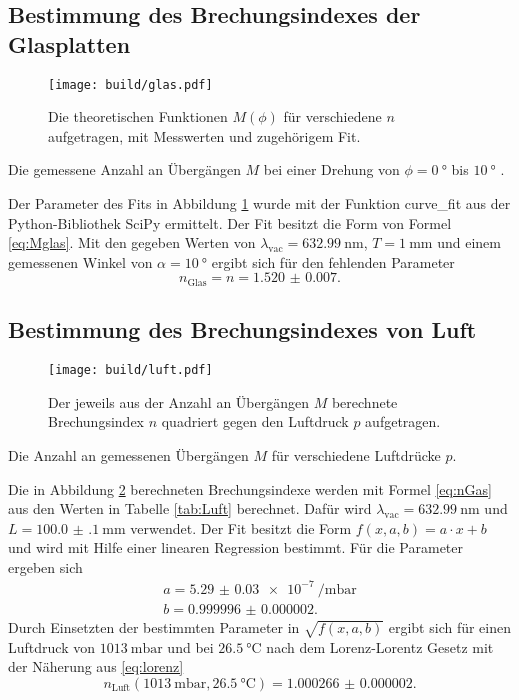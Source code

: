 \subsection{Bestimmung des Brechungsindexes der Glasplatten}
\label{ssec:glas}
\begin{figure}
	\centering
	\texttt{[image: build/glas.pdf]}
	\caption{Die theoretischen Funktionen $M(\phi)$ für verschiedene $n$ aufgetragen, mit Messwerten und zugehörigem Fit.}
	\label{fig:Glas}
\end{figure}
\begin{table}
	\centering
	\caption{Die gemessene Anzahl an Übergängen $M$ bei einer Drehung von $\phi=\SI{0}{\degree}$ bis $\SI{10}{\degree}$ .}
	
\end{table}
Der Parameter des Fits in Abbildung \ref{fig:Glas} wurde mit der Funktion curve\_fit aus der Python-Bibliothek SciPy \cite{scipy} ermittelt. Der Fit besitzt die Form von Formel \eqref{eq:Mglas}. Mit den gegeben Werten von $\lambda_\text{vac}=\SI{632.99}{\nano\meter}$, $T=\SI{1}{\milli\meter}$ \cite{V64} und einem gemessenen Winkel von $\alpha=\SI{10}{\degree}$ ergibt sich für den fehlenden Parameter
\begin{displaymath}
	n_\text{Glas}=n=\num{1.520(7)}.
\end{displaymath}

\subsection{Bestimmung des Brechungsindexes von Luft}
\label{ssec:luft}
\begin{figure}
	\centering
	\texttt{[image: build/luft.pdf]}
	\caption{Der jeweils aus der Anzahl an Übergängen $M$ berechnete Brechungsindex $n$ quadriert gegen den Luftdruck $p$ aufgetragen.}
	\label{fig:Luft}
\end{figure}
\begin{table}
	\centering
	\caption{Die Anzahl an gemessenen Übergängen $M$ für verschiedene Luftdrücke $p$.}
	
\end{table}
Die in Abbildung \ref{fig:Luft} berechneten Brechungsindexe werden mit Formel \eqref{eq:nGas} aus den Werten in Tabelle \ref{tab:Luft} berechnet. Dafür wird $\lambda_\text{vac}=\SI{632.99}{\nano\meter}$ und $L=\SI{100.0(1)}{\milli\meter}$ \cite{V64} verwendet. Der Fit besitzt die Form $f(x,a,b) =a\cdot x +b$ und wird mit Hilfe einer linearen Regression bestimmt. Für die Parameter ergeben sich
\begin{gather*}
	a=\SI{5.29(3)e-7}{\per\milli\bar}\\
	b=\num{0.999996(2)}.
\end{gather*}
Durch Einsetzten der bestimmten Parameter in $\sqrt{f(x,a,b)}$ ergibt sich für einen Luftdruck von $\SI{1013}{\milli\bar}$ und bei $\SI{26.5}{\degreeCelsius}$ nach dem Lorenz-Lorentz Gesetz mit der Näherung aus \eqref{eq:lorenz}
\begin{displaymath}
 n_\text{Luft}(\SI{1013}{\milli\bar},\SI{26.5}{\degreeCelsius})=\num{1.000266(2)}.
\end{displaymath}